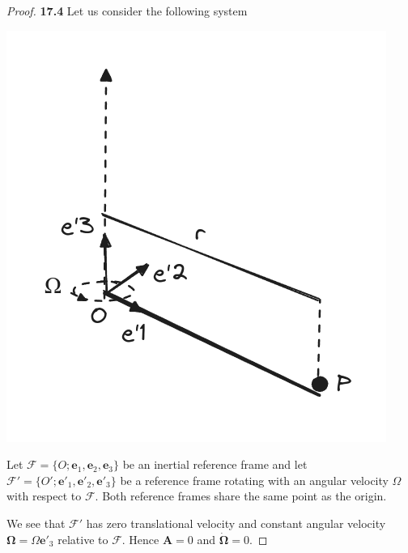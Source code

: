 \documentclass[11pt]{article}
\theoremstyle{definition}
\begin{document}
\begin{proof}{\textbf{17.4}}
    Let us consider the following system
    \begin{center}
        \includegraphics[scale=0.5]{ch17-4.png}
    \end{center}
    Let $\mathcal{F} = \{O; \bm e_1,\bm e_2,\bm e_3\}$ be an inertial reference
    frame and let  $\mathcal{F}' = \{O'; \bm e'_1,\bm e'_2,\bm e'_3\}$
    be a reference frame rotating with an angular velocity $\Omega$ with 
    respect to $\mathcal{F}$. Both reference frames share the same point as
    the origin.
    
    We see that $\mathcal{F}'$ has zero translational velocity and
    constant angular velocity $\bm\Omega =\Omega \bm e'_3$ relative to
    $\mathcal{F}$. Hence $\bm A = 0$ and $\bm{\dot\Omega} = 0$.


\end{proof}
\end{document}
